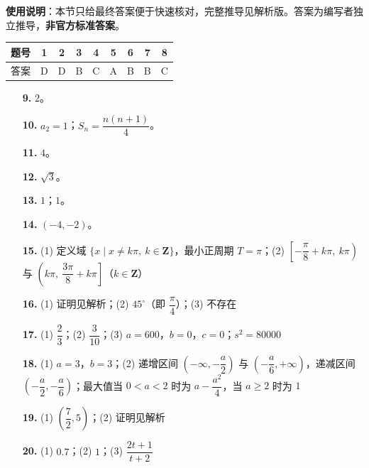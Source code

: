 
\begin{gknotice}
\textbf{使用说明}：本节只给最终答案便于快速核对，完整推导见解析版。答案为编写者独立推导，\textbf{非官方标准答案}。
\end{gknotice}

\begin{center}\begin{tabular}{ccccccccc}
\toprule
题号 & 1 & 2 & 3 & 4 & 5 & 6 & 7 & 8 \\
\midrule
答案 & D & D & B & C & A & B & B & C \\
\bottomrule
\end{tabular}\end{center}

\begin{itemize}[leftmargin=2.6em]
  \item[\textbf{9.}] $2$。
  \item[\textbf{10.}] $a_2=1$；$S_n=\dfrac{n(n+1)}4$。
  \item[\textbf{11.}] $4$。
  \item[\textbf{12.}] $\sqrt3$。
  \item[\textbf{13.}] $1$；$1$。
  \item[\textbf{14.}] $(-4,-2)$。
\end{itemize}

\begin{itemize}[leftmargin=2.6em]
  \item[\textbf{15.}] (1) 定义域 $\{x\mid x\neq k\pi,\ k\in\mathbf Z\}$，最小正周期 $T=\pi$；(2) $\left[-\dfrac\pi8+k\pi,\ k\pi\right)$ 与 $\left(k\pi,\ \dfrac{3\pi}8+k\pi\right]$（$k\in\mathbf Z$）
  \item[\textbf{16.}] (1) 证明见解析；(2) $45^\circ$（即 $\dfrac\pi4$）；(3) 不存在
  \item[\textbf{17.}] (1) $\dfrac23$；(2) $\dfrac3{10}$；(3) $a=600$，$b=0$，$c=0$；$s^2=80000$
  \item[\textbf{18.}] (1) $a=3$，$b=3$；(2) 递增区间 $\left(-\infty,-\dfrac a2\right)$ 与 $\left(-\dfrac a6,+\infty\right)$，递减区间 $\left(-\dfrac a2,-\dfrac a6\right)$；最大值当 $0<a<2$ 时为 $a-\dfrac{a^2}4$，当 $a\geqslant2$ 时为 $1$
  \item[\textbf{19.}] (1) $\left(\dfrac72,5\right)$；(2) 证明见解析
  \item[\textbf{20.}] (1) $0.7$；(2) $1$；(3) $\dfrac{2t+1}{t+2}$
\end{itemize}
